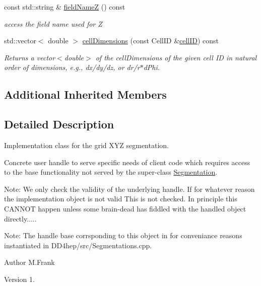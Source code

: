 \begin{DoxyCompactItemize}
const std\+::string \& \hyperlink{class_d_d4hep_1_1_geometry_1_1_cartesian_grid_x_y_z_ae1ede1ac10e997686cc62191d4c25780}{field\+NameZ} () const
\begin{DoxyCompactList}\small\item\em access the field name used for Z \end{DoxyCompactList}\item 
std\+::vector$<$ double $>$ \hyperlink{class_d_d4hep_1_1_geometry_1_1_cartesian_grid_x_y_z_ac4f552317dec7149a390d51984f398d5}{cell\+Dimensions} (const Cell\+ID \&\hyperlink{class_d_d4hep_1_1_geometry_1_1_cartesian_grid_x_y_z_a8dedaeb385bc59155413184fc796aa56}{cell\+ID}) const
\begin{DoxyCompactList}\small\item\em Returns a vector$<$double$>$ of the cell\+Dimensions of the given cell ID in natural order of dimensions, e.\+g., dx/dy/dz, or dr/r$\ast$d\+Phi. \end{DoxyCompactList}\end{DoxyCompactItemize}
\subsection*{Additional Inherited Members}


\subsection{Detailed Description}
Implementation class for the grid X\+YZ segmentation. 

Concrete user handle to serve specific needs of client code which requires access to the base functionality not served by the super-\/class \hyperlink{class_d_d4hep_1_1_geometry_1_1_segmentation}{Segmentation}.

Note\+: We only check the validity of the underlying handle. If for whatever reason the implementation object is not valid This is not checked. In principle this C\+A\+N\+N\+OT happen unless some brain-\/dead has fiddled with the handled object directly.....

Note\+: The handle base corrsponding to this object in for conveniance reasons instantiated in D\+D4hep/src/\+Segmentations.\+cpp.

\begin{DoxyAuthor}{Author}
M.\+Frank 
\end{DoxyAuthor}
\begin{DoxyVersion}{Version}
1. 
\end{DoxyVersion}


